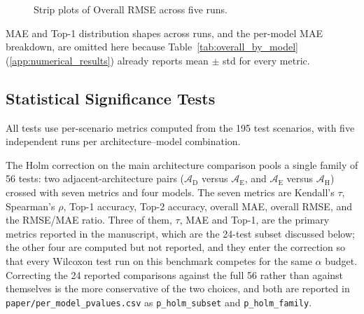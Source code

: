 \documentclass[11pt]{article}
\begin{document}
\begin{figure}[htbp]
\begin{minipage}{0.24\textwidth}
\begin{tikzpicture}
\end{tikzpicture}
\end{minipage}
\hfill
\begin{minipage}{0.24\textwidth}
\centering
{}
\end{minipage}
\caption{Strip plots of Overall RMSE across five runs.}
\label{fig:violin_rmse}
\end{figure}

MAE and Top-1 distribution shapes across runs, and the per-model MAE breakdown, are omitted here because Table~\ref{tab:overall_by_model} (\ref{app:numerical_results}) already reports mean $\pm$ std for every metric.

\subsection{Statistical Significance Tests}
\label{app:significance}

All tests use per-scenario metrics computed from the 195 test scenarios, with five independent runs per architecture--model combination.

The Holm correction on the main architecture comparison pools a single family of 56 tests: two adjacent-architecture pairs ($\mathcal{A}_{\text{D}}$ versus $\mathcal{A}_{\text{E}}$, and $\mathcal{A}_{\text{E}}$ versus $\mathcal{A}_{\text{H}}$) crossed with seven metrics and four models. The seven metrics are Kendall's $\tau$, Spearman's $\rho$, Top-1 accuracy, Top-2 accuracy, overall MAE, overall RMSE, and the RMSE/MAE ratio. Three of them, $\tau$, MAE and Top-1, are the primary metrics reported in the manuscript, which are the 24-test subset discussed below; the other four are computed but not reported, and they enter the correction so that every Wilcoxon test run on this benchmark competes for the same $\alpha$ budget. Correcting the 24 reported comparisons against the full 56 rather than against themselves is the more conservative of the two choices, and both are reported in \texttt{paper/per\_model\_pvalues.csv} as \texttt{p\_holm\_subset} and \texttt{p\_holm\_family}.
\end{document}
